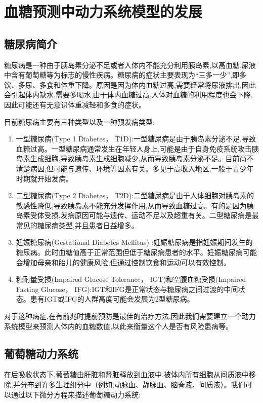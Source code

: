 \chapter{血糖预测中动力系统模型的发展}
\section{糖尿病简介}
糖尿病是一种由于胰岛素分泌不足或者人体内不能充分利用胰岛素,以高血糖,尿液中含有葡萄糖等为标志的慢性疾病。糖尿病的症状主要表现为“三多一少”,即多饮、多尿、多食和体重下降。原因是因为体内血糖过高,需要经常将尿液排出,因此会引起体内缺水,需要多喝水,由于体内血糖过高,人体对血糖的利用程度也会下降,因此可能还有无意识体重减轻和多食的症状。

目前糖尿病主要有三种类型以及一种预发病类型\cite{whoDiabetes}:
\begin{enumerate}
    \item 一型糖尿病(Type 1 Diabetes， T1D):一型糖尿病是由于胰岛素分泌不足,导致血糖过高。一型糖尿病通常发生在年轻人身上,可能是由于自身免疫系统攻击胰岛素生成细胞,导致胰岛素生成细胞减少,从而导致胰岛素分泌不足。目前尚不清楚病因,但可能与遗传、环境等因素有关。多见于高收入地区,一般于青少年时期就开始发病。
    \item 二型糖尿病(Type 2 Diabetes， T2D):二型糖尿病是由于人体细胞对胰岛素的敏感性降低,导致胰岛素不能充分发挥作用,从而导致血糖过高。有的是因为胰岛素受体受损,发病原因可能与遗传、运动不足以及超重有关。二型糖尿病是最常见的糖尿病类型,并且患者日益增多。
    \item 妊娠糖尿病(Gestational Diabetes Mellitus)
    :妊娠糖尿病是指妊娠期间发生的糖尿病。此时血糖值高于正常范围但低于糖尿病患者的水平。妊娠糖尿病可能会增加母亲和胎儿的健康风险,但通过控制饮食和运动可以有效控制。
    \item 糖耐量受损(Impaired Glucose Tolerance， IGT)和空腹血糖受损(Impaired Fasting Glucose， IFG):IGT和IFG是正常状态与糖尿病之间过渡的中间状态。患有IGT或IFG的人群高度可能会发展为2型糖尿病。
\end{enumerate}

对于这种病症,在有前兆时提前预防是最佳的治疗方法,因此我们需要建立一个动力系统模型来预测人体内的血糖数值,以此来衡量这个人是否有风险患病等。

\section{葡萄糖动力系统}
在后吸收状态下,葡萄糖由肝脏和肾脏释放到血液中,被体内所有细胞从间质液中移除,并分布到许多生理组分中（例如,动脉血、静脉血、脑脊液、间质液）。我们可以通过以下微分方程来描述葡萄糖动力系统\cite{bergman1979quantitative}:

